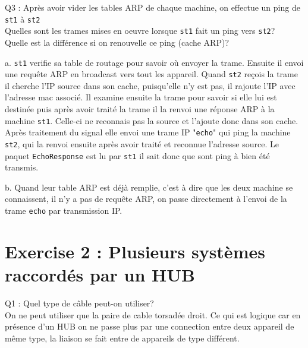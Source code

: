 \documentclass[11pt]{book}
\begin{document}
        \begin{dent}{Q3 :} Après avoir vider les tables ARP de chaque machine, on effectue un ping de \texttt{st1} à \texttt{st2}\\
            Quelles sont les trames mises en oeuvre lorsque \texttt{st1} fait un ping vers \texttt{st2}?\\
            Quelle est la différence si on renouvelle ce ping (cache ARP)?

            \begin{enum}{-15pt}{-15pt}
                \item[a.] \texttt{st1} verifie sa table de routage pour savoir où envoyer la trame. Ensuite il envoi une requête ARP en broadcast vers tout les appareil. Quand \texttt{st2} reçois la trame il cherche l'IP source dans son cache, puisqu'elle n'y est pas, il rajoute l'IP avec l'adresse mac associé. Il examine ensuite la trame pour savoir si elle lui est destinée puis après avoir traité la trame il la renvoi une réponse ARP à la machine \texttt{st1}. Celle-ci ne reconnais pas la source et l'ajoute donc dans son cache. Après traitement du signal elle envoi une trame IP "\texttt{echo}" qui ping la machine \texttt{st2}, qui la renvoi ensuite après avoir traité et reconnue l'adresse source. Le paquet \texttt{EchoResponse} est lu par \texttt{st1} il sait donc que sont ping à bien été transmis. 
                \item[b.] Quand leur table ARP est déjà remplie, c'est à dire que les deux machine se connaissent, il n'y a pas de requête ARP, on passe directement à l'envoi de la trame \texttt{echo} par transmission IP.
            \end{enum}
         \end{dent}
        
    \section{Exercise 2 : Plusieurs systèmes raccordés par un HUB}
        
        \begin{dent}{Q1 :} Quel type de câble peut-on utiliser?\\
            On ne peut utiliser que la paire de cable torsadée droit. Ce qui est logique car en présence d'un HUB on ne passe plus par une connection entre deux appareil de même type, la liaison se fait entre de appareils de type différent. 
         \end{dent}
\end{document}
